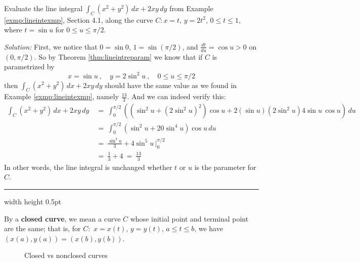 \begin{exmp}
 Evaluate the line integral $\int_C (x^2 + y^2 )\,dx + 2xy\,dy$ from Example \ref{exmp:lineintexmp}, Section 4.1, along
 the curve $C: x=t$, $y=2t^2$, $0 \le t \le 1$, where $t=\sin u$ for $0 \le u \le \pi/2$.\smallskip
 \par\noindent \emph{Solution:} First, we notice that $0=\sin 0$, $1=\sin (\pi/2)$, and $\frac{dt}{du} = \cos u > 0$ on
 $(0,\pi/2)$. So by Theorem \ref{thm:lineintreparam} we know that if $C$ is parametrized by
 \begin{displaymath}
  x=\sin u ~,\quad y = 2\sin^2 u ~,\quad 0 \le u \le \pi/2
 \end{displaymath}
 then $\int_C (x^2 + y^2 )\,dx + 2xy\,dy$ should have the same value as we found in Example \ref{exmp:lineintexmp},
 namely $\frac{13}{3}$. And we can indeed verify this:
 \begin{align*}
  \int_C (x^2 + y^2 )\,dx + 2xy\,dy ~&=~ \int_0^{\pi/2} \left( (\sin^2 u + (2\sin^2 u)^2) \cos u +
   2(\sin u)(2\sin^2 u) 4\sin u \, \cos u \right)\,du\\
   &=~ \int_0^{\pi/2} \left( \sin^2 u + 20\sin^4 u \right) \cos u\,du\\
   &=~ \frac{\sin^3 u}{3} + 4\sin^5 u \,\Bigg|_0^{\pi/2}\\
   &=~ \frac{1}{3} + 4 ~=~ \frac{13}{3}
 \end{align*}
 In other words, the line integral is unchanged whether $t$ or $u$ is the parameter for $C$.
\end{exmp}
\hrule width \textwidth height 0.5pt
\medskip

By a \textbf{closed curve}, we mean a curve $C$ whose initial point and terminal point are the same;
that is, for $C:$
$x=x(t)$, $y=y(t)$, $a \le t \le b$, we have $(x(a),y(a)) = (x(b),y(b))$.

\begin{figure}[h]
 \centering
 \qquad\qquad
 \caption[]{\quad Closed vs nonclosed curves}
 \label{fig:closedcurve}
\end{figure}

